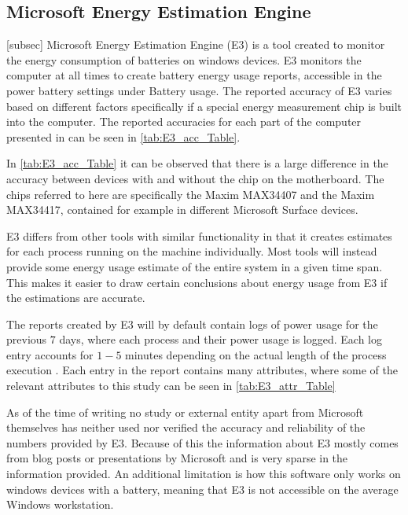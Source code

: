 \subsection{Microsoft Energy Estimation Engine}[subsec]\label{subsec:e3}
Microsoft Energy Estimation Engine (E3) is a tool created to monitor the energy consumption of batteries on windows devices. E3 monitors the computer at all times to create battery energy usage reports, accessible in the power battery settings under Battery usage.\cite[p.43]{E3WinHec}
The reported accuracy of E3 varies based on different factors specifically if a special energy measurement chip is built into the computer. The reported accuracies for each part of the computer presented in \cite*{E3WinHec} can be seen in \cref{tab:E3_acc_Table}.



In \cref{tab:E3_acc_Table} it can be observed that there is a large difference in the accuracy between devices with and without the chip on the motherboard. The chips referred to here are specifically the Maxim MAX34407 and the Maxim MAX34417, contained for example in different Microsoft Surface devices.


E3 differs from other tools with similar functionality in that it creates estimates for each process running on the machine individually. Most tools will instead provide some energy usage estimate of the entire system in a given time span. This makes it easier to draw certain conclusions about energy usage from E3 if the estimations are accurate. 

The reports created by E3 will by default contain logs of power usage for the previous $7$ days, where each process and their power usage is logged. Each log entry accounts for $1-5$ minutes depending on the actual length of the process execution \cite[]{E3Video}. Each entry in the report contains many attributes, where some of the relevant attributes to this study can be seen in \cref{tab:E3_attr_Table}



As of the time of writing no study or external entity apart from Microsoft themselves has neither used nor verified the accuracy and reliability of the numbers provided by E3. Because of this the information about E3 mostly comes from blog posts or presentations by Microsoft and is very sparse in the information provided. An additional limitation is how this software only works on windows devices with a battery, meaning that E3 is not accessible on the average Windows workstation.

